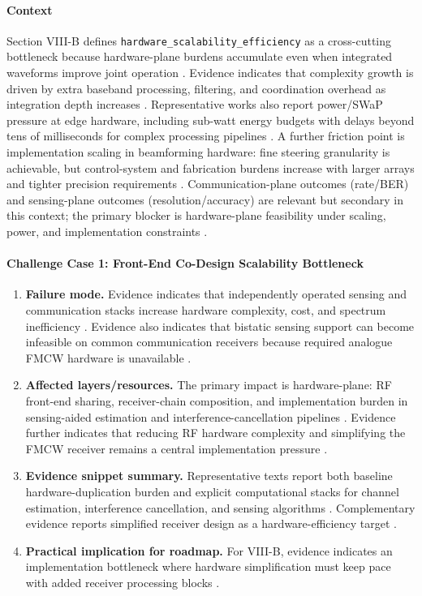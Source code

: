 \paragraph{Context}
Section VIII-B defines \texttt{hardware\_scalability\_efficiency} as a cross-cutting bottleneck because hardware-plane burdens accumulate even when integrated waveforms improve joint operation \cite{O_ISAC_035, O_ISAC_162}. Evidence indicates that complexity growth is driven by extra baseband processing, filtering, and coordination overhead as integration depth increases \cite{O_ISAC_162}. Representative works also report power/SWaP pressure at edge hardware, including sub-watt energy budgets with delays beyond tens of milliseconds for complex processing pipelines \cite{O_ISAC_093}. A further friction point is implementation scaling in beamforming hardware: fine steering granularity is achievable, but control-system and fabrication burdens increase with larger arrays and tighter precision requirements \cite{O_ISAC_171}. Communication-plane outcomes (rate/BER) and sensing-plane outcomes (resolution/accuracy) are relevant but secondary in this context; the primary blocker is hardware-plane feasibility under scaling, power, and implementation constraints \cite{O_ISAC_093, O_ISAC_162, O_ISAC_171}.

\paragraph{Challenge Case 1: Front-End Co-Design Scalability Bottleneck}
\begin{enumerate}
    \item \textbf{Failure mode.} Evidence indicates that independently operated sensing and communication stacks increase hardware complexity, cost, and spectrum inefficiency \cite{O_ISAC_237}. Evidence also indicates that bistatic sensing support can become infeasible on common communication receivers because required analogue FMCW hardware is unavailable \cite{O_ISAC_237}.
    \item \textbf{Affected layers/resources.} The primary impact is hardware-plane: RF front-end sharing, receiver-chain composition, and implementation burden in sensing-aided estimation and interference-cancellation pipelines \cite{O_ISAC_237}. Evidence further indicates that reducing RF hardware complexity and simplifying the FMCW receiver remains a central implementation pressure \cite{O_ISAC_035}.
    \item \textbf{Evidence snippet summary.} Representative texts report both baseline hardware-duplication burden and explicit computational stacks for channel estimation, interference cancellation, and sensing algorithms \cite{O_ISAC_237}. Complementary evidence reports simplified receiver design as a hardware-efficiency target \cite{O_ISAC_035}.
    \item \textbf{Practical implication for roadmap.} For VIII-B, evidence indicates an implementation bottleneck where hardware simplification must keep pace with added receiver processing blocks \cite{O_ISAC_237, O_ISAC_035}.
\end{enumerate}


